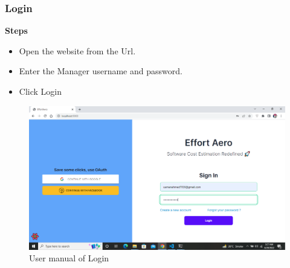 \subsubsection{Login}
\textbf{Steps}
\begin{itemize}
    \item Open the website from the Url.
    \item Enter the Manager username and password.
    \item Click Login
\end{itemize}
\begin{figure}[H]
    \centering
    \includegraphics[scale=0.4]{./diagrams/user-manual/Screenshot (17).png}
    \caption{User manual of Login}
    \label{fig:user-1}

\end{figure}

